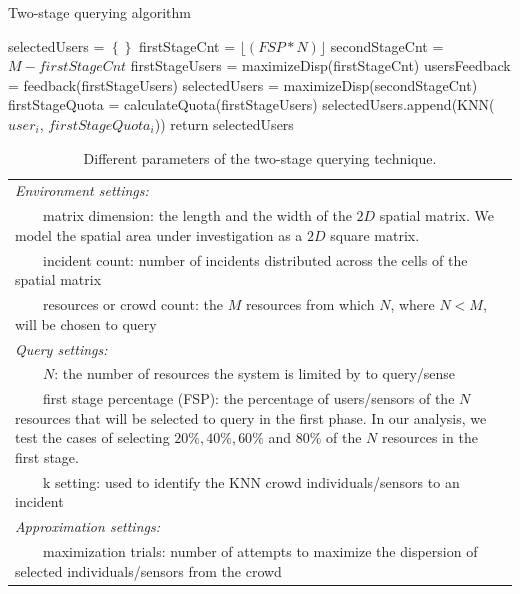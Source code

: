 \documentclass{acm_proc_article-sp}
\newcommand\floor[1]{\lfloor#1\rfloor}
\newcommand{\tabitem}{~~\llap{\textbullet}~~}
\begin{document}
\begin{algorithm}
\caption{Two-stage querying algorithm}
\label{TSalgorithm}
 \begin{algorithmic}[1]
         \State selectedUsers = $\left\{\right\}$
         \State firstStageCnt = $\floor{(FSP*N)}$
         \State secondStageCnt = $M - firstStageCnt$
         \State firstStageUsers = maximizeDisp(firstStageCnt)
         \State usersFeedback = feedback(firstStageUsers)
                \State selectedUsers = maximizeDisp(secondStageCnt){}
         \Else
         \EndIf 
       \State firstStageQuota = calculateQuota(firstStageUsers)
     \State selectedUsers.append(KNN($user_i$, $firstStageQuota_i$))
   \EndFor
\State return {selectedUsers}
\EndFunction
\end{algorithmic}
\end{algorithm}
\begin{table}{}
\centering
\begin{tabulary}{0.5\textwidth}{|L|}
\hline
\textit{Environment settings: }\\
\tabitem matrix dimension: the length and
the width of the $2D$ spatial matrix. We model the spatial area under investigation as a $2D$ square matrix.\\
\tabitem incident count: number of incidents distributed across the cells of the spatial matrix\\
\tabitem resources or crowd count: the $M$ resources from which $N$, where $N < M$, will be chosen to query\\
\hline
\textit{Query settings:}\\
\tabitem $N$: the number of resources the system is limited by to query/sense \\
\tabitem first stage percentage (FSP): the percentage of users/sensors of the $N$ resources that will be selected to query in the first phase. In our analysis, we test the cases of selecting $20\%, 40\%, 60\%$ and $80\%$ of the $N$ resources in the first stage.\\
\tabitem k setting: used to identify the KNN crowd individuals/sensors to an incident\\
\hline
\textit{Approximation settings: }\\
\tabitem maximization trials: number of attempts to maximize the dispersion of selected individuals/sensors from the crowd\\
\hline
\end{tabulary}
\caption{Different parameters of the two-stage querying technique.}
\label{table:systemParameters}
\end{table}
\end{document}
